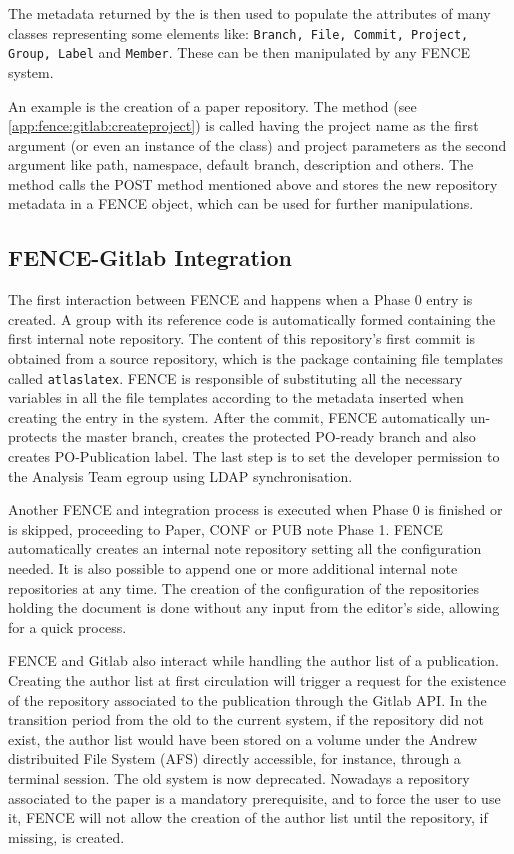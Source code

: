 The metadata returned by the  is then used to populate the attributes of many classes representing some \gitlab elements like:
\texttt{Branch, File, Commit, Project, Group, Label} and \texttt{Member}.
These can be then manipulated by any FENCE system.

An example is the creation of a paper repository.
The  method (see \cref{app:fence:gitlab:createproject}) is called having the project name as the first argument
(or even an instance of the  class) and project parameters as the second argument like path, namespace, default branch, description and others.
The method calls the POST method mentioned above and stores the new repository metadata in a FENCE  object, which can be used for further manipulations.



\subsection{FENCE-Gitlab Integration}%
\label{sec:FENCE-Gitlab_Integration}
The first interaction between FENCE and \gitlab happens when a Phase 0 entry is created.
A group with its reference code is automatically formed containing the first internal note repository.
The content of this repository’s first commit is obtained from a source repository,
which is the package containing file templates called \texttt{atlaslatex}.
FENCE is responsible of substituting all the necessary variables in all the file templates according to the metadata inserted when creating the entry in the system. After the commit, FENCE automatically un-protects the master branch, creates the protected PO-ready branch and also creates PO-Publication label. The last step is to set the developer permission to the Analysis Team egroup using LDAP synchronisation.

Another FENCE and \gitlab integration process is executed when Phase 0 is finished or is skipped, proceeding to Paper, CONF or PUB note Phase 1.
FENCE automatically creates an internal note repository setting all the configuration needed.
It is also possible to append one or more additional internal note repositories at any time.
The creation of the configuration of the repositories holding the document is done without any input from the editor’s side, allowing for a quick process.

FENCE and Gitlab also interact while handling the author list of a publication.
Creating the author list at first circulation will trigger a request for the existence of the \gitlab repository associated to the publication through the Gitlab API\@.
In the transition period from the old to the current system,
if the repository did not exist, the author list would have been stored on a volume under the Andrew distribuited File System (AFS) directly accessible, for instance, through a terminal session.
The old system is now deprecated.
Nowadays a \gitlab repository associated to the paper is a mandatory prerequisite, and to force the user to use it,
FENCE will not allow the creation of the author list until the repository, if missing, is created.

